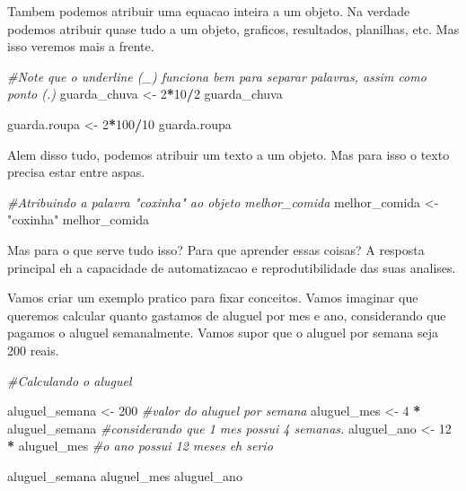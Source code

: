 \documentclass[
]{book}
\newenvironment{Shaded}{\begin{snugshade}}{\end{snugshade}}
\newcommand{\CommentTok}[1]{\textcolor[rgb]{0.56,0.35,0.01}{\textit{#1}}}
\newcommand{\DecValTok}[1]{\textcolor[rgb]{0.00,0.00,0.81}{#1}}
\newcommand{\NormalTok}[1]{#1}
\newcommand{\OtherTok}[1]{\textcolor[rgb]{0.56,0.35,0.01}{#1}}
\newcommand{\SpecialCharTok}[1]{\textcolor[rgb]{0.81,0.36,0.00}{\textbf{#1}}}
\newcommand{\StringTok}[1]{\textcolor[rgb]{0.31,0.60,0.02}{#1}}
\begin{document}
Tambem podemos atribuir uma equacao inteira a um objeto. Na verdade podemos atribuir quase tudo a um objeto, graficos, resultados, planilhas, etc. Mas isso veremos mais a frente.

\begin{Shaded}
\begin{Highlighting}[]
\CommentTok{\#Note que o underline (\_) funciona bem para separar palavras, assim como ponto (.)}
\NormalTok{guarda\_chuva }\OtherTok{\textless{}{-}} \DecValTok{2}\SpecialCharTok{*}\DecValTok{10}\SpecialCharTok{/}\DecValTok{2}
\NormalTok{guarda\_chuva}

\NormalTok{guarda.roupa }\OtherTok{\textless{}{-}} \DecValTok{2}\SpecialCharTok{*}\DecValTok{100}\SpecialCharTok{/}\DecValTok{10}
\NormalTok{guarda.roupa}
\end{Highlighting}
\end{Shaded}

Alem disso tudo, podemos atribuir um texto a um objeto. Mas para isso o texto precisa estar entre aspas.

\begin{Shaded}
\begin{Highlighting}[]
\CommentTok{\#Atribuindo a palavra "coxinha" ao objeto melhor\_comida}
\NormalTok{melhor\_comida }\OtherTok{\textless{}{-}} \StringTok{"coxinha"}
\NormalTok{melhor\_comida}
\end{Highlighting}
\end{Shaded}

Mas para o que serve tudo isso? Para que aprender essas coisas? A resposta principal eh a capacidade de automatizacao e reprodutibilidade das suas analises.

Vamos criar um exemplo pratico para fixar conceitos. Vamos imaginar que queremos calcular quanto gastamos de aluguel por mes e ano, considerando que pagamos o aluguel semanalmente. Vamos supor que o aluguel por semana seja 200 reais.

\begin{Shaded}
\begin{Highlighting}[]
\CommentTok{\#Calculando o aluguel}

\NormalTok{aluguel\_semana }\OtherTok{\textless{}{-}} \DecValTok{200}              \CommentTok{\#valor do aluguel por semana}
\NormalTok{aluguel\_mes }\OtherTok{\textless{}{-}} \DecValTok{4} \SpecialCharTok{*}\NormalTok{ aluguel\_semana  }\CommentTok{\#considerando que 1 mes possui 4 semanas.}
\NormalTok{aluguel\_ano }\OtherTok{\textless{}{-}} \DecValTok{12} \SpecialCharTok{*}\NormalTok{ aluguel\_mes    }\CommentTok{\#o ano possui 12 meses eh serio}

\NormalTok{aluguel\_semana}
\NormalTok{aluguel\_mes}
\NormalTok{aluguel\_ano}
\end{Highlighting}
\end{Shaded}
\end{document}
